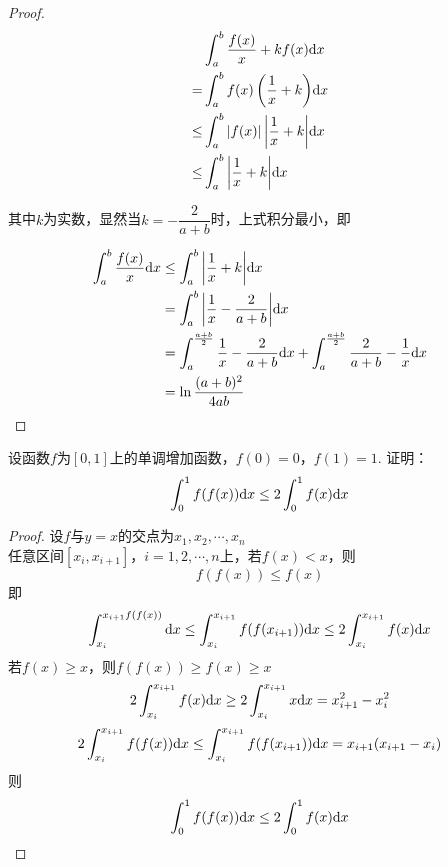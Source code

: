 \begin{proof}

    \begin{align*}
        & \int_{a}^{b}{\dfrac{f(x)}{x} + kf(x)}\mathrm{d} x \\
        = & \int_{a}^{b}{f(x) \left( \dfrac{1}{x} + k \right)}\mathrm{d} x \\
        \leq & \int_{a}^{b}{|f(x)| \left| \dfrac{1}{x} + k \right|}\mathrm{d} x \\
        \leq & \int_{a}^{b}{\left| \dfrac{1}{x} + k \right|}\mathrm{d} x
    \end{align*}

    其中$k$为实数，显然当$k = - \dfrac{2}{a + b}$时，上式积分最小，即

    \begin{align*}
        \int_{a}^{b}{\dfrac{f(x)}{x}}\mathrm{d} x & \leq \int_{a}^{b}{\left| \dfrac{1}{x} + k \right|}\mathrm{d} x \\  
        & = \int_{a}^{b}{\left| \dfrac{1}{x} - \dfrac{2}{a + b} \right|}\mathrm{d} x \\
        & = \int_{a}^{\frac{a + b}{2}}{\dfrac{1}{x} - \dfrac{2}{a + b}}\mathrm{d} x + \int_{a}^{\frac{a + b}{2}}{\dfrac{2}{a + b} - \dfrac{1}{x}}\mathrm{d} x \\
        & = \ln{\dfrac{(a + b)^2}{4ab}}
    \end{align*}

\end{proof}

\begin{proposition}

    设函数$f$为$[0, 1]$上的单调增加函数，$f(0) = 0$，$f(1) = 1$. 证明：
    \[\int_{0}^{1}{f(f(x))}\mathrm{d} x \leq 2\int_{0}^{1}{f(x)}\mathrm{d} x\]

\end{proposition}

\begin{proof}

    设$f$与$y = x$的交点为$x_1, x_2, \cdots , x_n$ \\
    任意区间$[x_i, x_{i + 1}]$，$i = 1, 2, \cdots, n$上，若$f(x) < x$，则
    \[f(f(x)) \leq f(x)\]
    即
    \[\int_{x_i}^{x_{i + 1}{f(f(x))}}\mathrm{d} x \leq \int_{x_i}^{x_{i + 1}}{f(f(x_{i + 1}))}\mathrm{d} x \leq 2\int_{x_i}^{x_{i + 1}}{f(x)}\mathrm{d} x\]
    若$f(x) \geq x$，则$f(f(x)) \geq f(x) \geq x$
    \[2\int_{x_i}^{x_{i + 1}}{f(x)}\mathrm{d} x \geq 2\int_{x_i}^{x_{i + 1}}{x}\mathrm{d} x = x_{i + 1}^2 - x_i^2\]
    \[2\int_{x_i}^{x_{i + 1}}{f(f(x))}\mathrm{d} x \leq \int_{x_i}^{x_{i + 1}}{f(f(x_{i + 1}))}\mathrm{d} x = x_{i + 1}(x_{i + 1} - x_i)\]
    则
    \[\int_{0}^{1}{f(f(x))}\mathrm{d} x \leq 2\int_{0}^{1}{f(x)}\mathrm{d} x\]

\end{proof}

